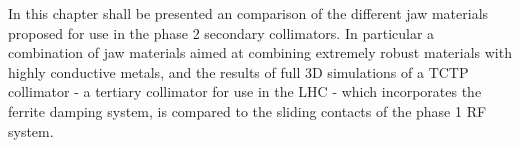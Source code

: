 In this chapter shall be presented an comparison of the different jaw materials proposed for use in the phase 2 secondary collimators. In particular a combination of jaw materials aimed at combining extremely robust materials with highly conductive metals, and the results of full 3D simulations of a TCTP collimator - a tertiary collimator for use in the LHC - which incorporates the ferrite damping system, is compared to the sliding contacts of the phase 1 RF system. 



%
%
%
%
%
%


